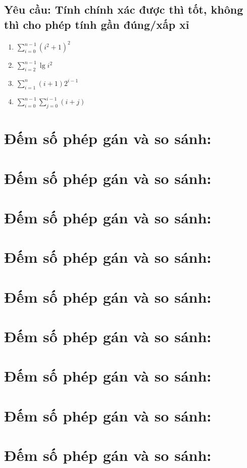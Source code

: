 \documentclass[12pt, letterpaper]{article}
\begin{document}
  \subsection{Yêu cầu: Tính chính xác được thì tốt, không thì cho phép tính gần đúng/xấp xỉ}
  \begin{enumerate}
    \item $ \sum^{n - 1}_{i = 0} {(i^2 + 1)}^2 $
    \item $ \sum^{n - 1}_{i = 2} \lg i^2 $
    \item $ \sum^{n}_{i = 1} (i + 1)2^{i - 1} $
    \item $ \sum^{n - 1}_{i = 0} \sum^{i - 1}_{j = 0} (i + j) $
  \end{enumerate}

  \section{Đếm số phép gán và so sánh:}
  \section{Đếm số phép gán và so sánh:}
  \section{Đếm số phép gán và so sánh:}
  \section{Đếm số phép gán và so sánh:}
  \section{Đếm số phép gán và so sánh:}
  \section{Đếm số phép gán và so sánh:}
  \section{Đếm số phép gán và so sánh:}
  \section{Đếm số phép gán và so sánh:}
  \section{Đếm số phép gán và so sánh:}
  
\end{document}
